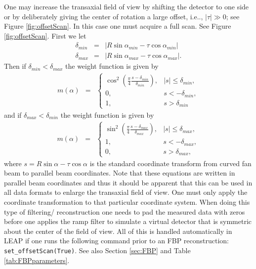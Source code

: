 \documentclass[11pt]{article}
\begin{document}
One may increase the transaxial field of view \cite{Gullberg_TMI_1986, Gregor_ICI_2003} by shifting the detector to one side or by deliberately giving the center of rotation a large offset, i.e.., $|\tau| \gg 0$; see Figure \ref{fig:offsetScan}.  In this case one must acquire a full scan.  See Figure \ref{fig:offsetScan}.  First we let
\begin{eqnarray*}
\delta_{min} &=& \left| R\sin\alpha_{min}-\tau \cos\alpha_{min}\right| \\
\delta_{max} &=& \left| R\sin\alpha_{max}-\tau \cos\alpha_{max}\right|.
\end{eqnarray*}
Then if $\delta_{min} < \delta_{max}$ the weight function is given by
\begin{eqnarray*}
m(\alpha) &=& \begin{cases} \cos^2\left( \frac{\pi}{4}\frac{s-\delta_{min}}{\delta_{min}} \right), & |s| \leq \delta_{min}, \\ 0, & s < -\delta_{min}, \\ 1, & s > \delta_{min} \end{cases}
\end{eqnarray*}
and if $\delta_{max} < \delta_{min}$ the weight function is given by
\begin{eqnarray*}
m(\alpha) &=& \begin{cases} \sin^2\left( \frac{\pi}{4}\frac{s-\delta_{max}}{\delta_{max}} \right), & |s| \leq \delta_{max}, \\ 1, & s < -\delta_{max}, \\ 0, & s > \delta_{max}, \end{cases}
\end{eqnarray*}
where $s = R\sin\alpha-\tau \cos\alpha$ is the standard coordinate transform from curved fan beam to parallel beam coordinates.  Note that these equations are written in parallel beam coordinates and thus it should be apparent that this can be used in all data formats to enlarge the transaxial field of view.  One must only apply the coordinate transformation to that particular coordinate system.  When doing this type of filtering/ reconstruction one needs to pad the measured data with zeros before one applies the ramp filter to simulate a virtual detector that is symmetric about the center of the field of view.  All of this is handled automatically in LEAP if one runs the following command prior to an FBP reconstruction: \texttt{set\_offsetScan(True)}.  See also Section \ref{sec:FBP} and Table \ref{tab:FBPparameters}.
\end{document}
